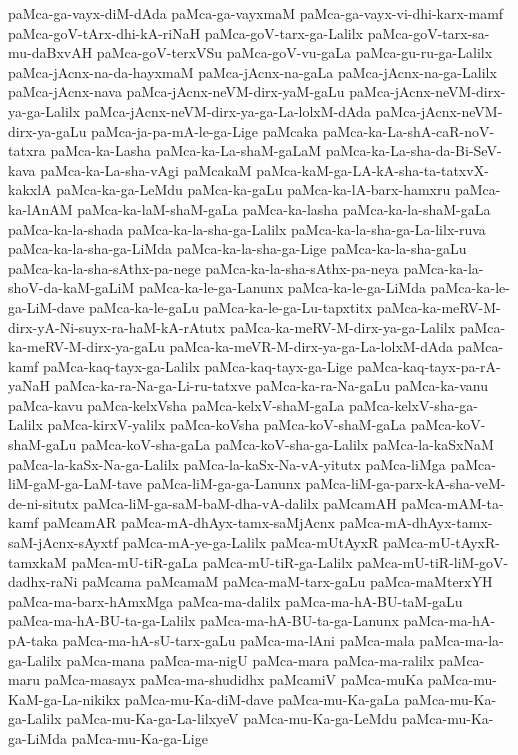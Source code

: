 {paMca-ga-vayx-diM-dAda
paMca-ga-vayxmaM
paMca-ga-vayx-vi-dhi-karx-mamf
paMca-goV-tArx-dhi-kA-riNaH
paMca-goV-tarx-ga-Lalilx
paMca-goV-tarx-sa-mu-daBxvAH
paMca-goV-terxVSu
paMca-goV-vu-gaLa
paMca-gu-ru-ga-Lalilx
paMca-jAcnx-na-da-hayxmaM
paMca-jAcnx-na-gaLa
paMca-jAcnx-na-ga-Lalilx
paMca-jAcnx-nava
paMca-jAcnx-neVM-dirx-yaM-gaLu
paMca-jAcnx-neVM-dirx-ya-ga-Lalilx
paMca-jAcnx-neVM-dirx-ya-ga-La-lolxM-dAda
paMca-jAcnx-neVM-dirx-ya-gaLu
paMca-ja-pa-mA-le-ga-Lige
paMcaka
paMca-ka-La-shA-caR-noV-tatxra
paMca-ka-Lasha
paMca-ka-La-shaM-gaLaM
paMca-ka-La-sha-da-Bi-SeV-kava
paMca-ka-La-sha-vAgi
paMcakaM
paMca-kaM-ga-LA-kA-sha-ta-tatxvX-kakxlA
paMca-ka-ga-LeMdu
paMca-ka-gaLu
paMca-ka-lA-barx-hamxru
paMca-ka-lAnAM
paMca-ka-laM-shaM-gaLa
paMca-ka-lasha
paMca-ka-la-shaM-gaLa
paMca-ka-la-shada
paMca-ka-la-sha-ga-Lalilx
paMca-ka-la-sha-ga-La-lilx-ruva
paMca-ka-la-sha-ga-LiMda
paMca-ka-la-sha-ga-Lige
paMca-ka-la-sha-gaLu
paMca-ka-la-sha-sAthx-pa-nege
paMca-ka-la-sha-sAthx-pa-neya
paMca-ka-la-shoV-da-kaM-gaLiM
paMca-ka-le-ga-Lanunx
paMca-ka-le-ga-LiMda
paMca-ka-le-ga-LiM-dave
paMca-ka-le-gaLu
paMca-ka-le-ga-Lu-tapxtitx
paMca-ka-meRV-M-dirx-yA-Ni-suyx-ra-haM-kA-rAtutx
paMca-ka-meRV-M-dirx-ya-ga-Lalilx
paMca-ka-meRV-M-dirx-ya-gaLu
paMca-ka-meVR-M-dirx-ya-ga-La-lolxM-dAda
paMca-kamf
paMca-kaq-tayx-ga-Lalilx
paMca-kaq-tayx-ga-Lige
paMca-kaq-tayx-pa-rA-yaNaH
paMca-ka-ra-Na-ga-Li-ru-tatxve
paMca-ka-ra-Na-gaLu
paMca-ka-vanu
paMca-kavu
paMca-kelxVsha
paMca-kelxV-shaM-gaLa
paMca-kelxV-sha-ga-Lalilx
paMca-kirxV-yalilx
paMca-koVsha
paMca-koV-shaM-gaLa
paMca-koV-shaM-gaLu
paMca-koV-sha-gaLa
paMca-koV-sha-ga-Lalilx
paMca-la-kaSxNaM
paMca-la-kaSx-Na-ga-Lalilx
paMca-la-kaSx-Na-vA-yitutx
paMca-liMga
paMca-liM-gaM-ga-LaM-tave
paMca-liM-ga-ga-Lanunx
paMca-liM-ga-parx-kA-sha-veM-de-ni-situtx
paMca-liM-ga-saM-baM-dha-vA-dalilx
paMcamAH
paMca-mAM-ta-kamf
paMcamAR
paMca-mA-dhAyx-tamx-saMjAcnx
paMca-mA-dhAyx-tamx-saM-jAcnx-sAyxtf
paMca-mA-ye-ga-Lalilx
paMca-mUtAyxR
paMca-mU-tAyxR-tamxkaM
paMca-mU-tiR-gaLa
paMca-mU-tiR-ga-Lalilx
paMca-mU-tiR-liM-goV-dadhx-raNi
paMcama
paMcamaM
paMca-maM-tarx-gaLu
paMca-maMterxYH
paMca-ma-barx-hAmxMga
paMca-ma-dalilx
paMca-ma-hA-BU-taM-gaLu
paMca-ma-hA-BU-ta-ga-Lalilx
paMca-ma-hA-BU-ta-ga-Lanunx
paMca-ma-hA-pA-taka
paMca-ma-hA-sU-tarx-gaLu
paMca-ma-lAni
paMca-mala
paMca-ma-la-ga-Lalilx
paMca-mana
paMca-ma-nigU
paMca-mara
paMca-ma-ralilx
paMca-maru
paMca-masayx
paMca-ma-shudidhx
paMcamiV
paMca-muKa
paMca-mu-KaM-ga-La-nikikx
paMca-mu-Ka-diM-dave
paMca-mu-Ka-gaLa
paMca-mu-Ka-ga-Lalilx
paMca-mu-Ka-ga-La-lilxyeV
paMca-mu-Ka-ga-LeMdu
paMca-mu-Ka-ga-LiMda
paMca-mu-Ka-ga-Lige
}
